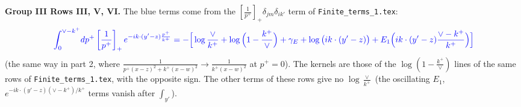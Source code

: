 \documentclass[9pt]{article}
\newcommand{\new}[1]{{\color{blue}#1}}
\numberwithin{equation}{section}
\begin{document}
\new{\textbf{Group III Rows III, V, VI.} The blue terms come from the $\left[\frac{1}{p^+}\right]_+\delta_{jm}\delta_{ik'}$ term of \texttt{Finite\_terms\_1.tex}:}
\begin{equation*}
\new{\int_0^{\vee-k^+}\!dp^+\left[\frac{1}{p^+}\right]_+e^{-ik\cdot(y'-z)\frac{p^+}{k^+}}=-\Big[\log\frac{\vee}{k^+}+\log\Big(1-\frac{k^+}{\vee}\Big)+\gamma_E+\log\big(ik\cdot(y'-z)\big)+E_1\Big(ik\cdot(y'-z)\frac{\vee-k^+}{k^+}\Big)\Big]}
\end{equation*}
\new{(the same way in part 2, where $\frac{1}{p^+(x-z)^2+k^+(x-w)^2}\to\frac{1}{k^+(x-w)^2}$ at $p^+=0$). The kernels are those of the $\log(1-\frac{k^+}{\vee})$ lines of the same rows of \texttt{Finite\_terms\_1.tex}, with the opposite sign. The other terms of these rows give no $\log\frac{\vee}{k^+}$ (the oscillating $E_1$, $e^{-ik\cdot(y'-z)(\vee-k^+)/k^+}$ terms vanish after $\int_{y'}$).}

\allowdisplaybreaks
\end{document}

